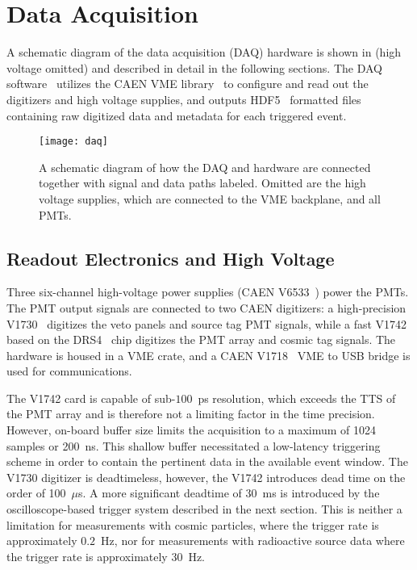 \section{Data Acquisition \label{sec:daq}}

A schematic diagram of the data acquisition (DAQ) hardware is shown in   (high voltage omitted) and described in detail in the following sections. 
The DAQ software~\cite{wblsdaq} utilizes the CAEN VME library~\cite{caen-vme} to configure and read out the digitizers and high voltage supplies, and outputs HDF5~\cite{hdf5} formatted files containing raw digitized data and metadata for each triggered event.

\begin{figure}
\centering
\texttt{[image: daq]}
\caption{A schematic diagram of how the DAQ and hardware are connected together with signal and data paths labeled. Omitted are the high voltage supplies, which are connected to the VME backplane, and all PMTs.}
\label{fig:daq}
\end{figure}


\subsection{Readout Electronics and High Voltage}
Three six-channel high-voltage power supplies (CAEN V6533~\cite{v6533}) power the PMTs. 
The PMT output signals are connected to two CAEN digitizers: a high-precision V1730~\cite{v1730} digitizes the veto panels and source tag PMT signals, while a fast V1742~\cite{v1742} based on the DRS4~\cite{drs4} chip digitizes the PMT array and cosmic tag signals.  
The hardware is housed in a VME crate, and a CAEN V1718~\cite{v1718} VME to USB bridge is used for communications.  

The V1742 card is capable of sub-$100$~ps resolution, which exceeds the TTS of the PMT array and is therefore not a limiting factor in the time precision.  
However, on-board buffer size limits the acquisition to a maximum of 1024 samples or 200~ns. 
This shallow buffer necessitated a low-latency triggering scheme in order to contain the pertinent data in the available event window. 
The V1730 digitizer is deadtimeless, however, the V1742 introduces dead time on the order of 100~$\mu$s.  
A more significant deadtime of 30~ms is introduced by the oscilloscope-based trigger system described in the next section.
This is neither a limitation for measurements with cosmic particles, where the trigger rate is approximately $0.2$~Hz, nor for measurements with radioactive source data where the trigger rate is approximately $30$~Hz.  

